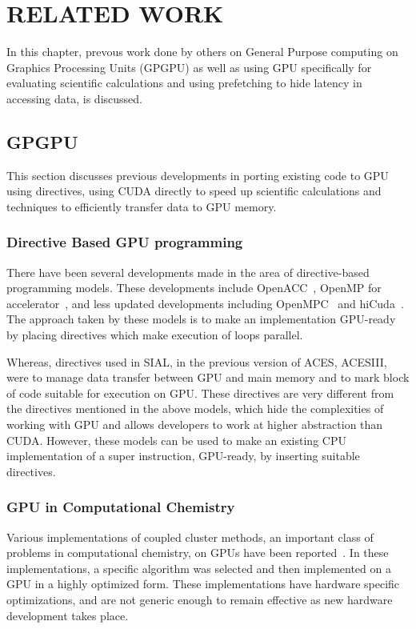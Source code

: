 \chapter{RELATED WORK}\label{lit}
In this chapter, prevous work done by others on General Purpose computing on Graphics Processing
Units (GPGPU) as well as using GPU specifically for evaluating scientific calculations
and using prefetching to hide latency in accessing data, is discussed.

\section{GPGPU}
This section discusses previous developments in porting existing
code to GPU using directives, using CUDA directly to speed up scientific calculations and
techniques to efficiently transfer data to GPU memory.

\subsection{Directive Based GPU programming}
There have been several developments made in the area of directive-based programming models. These
developments include OpenACC~\cite{openacc}, OpenMP for
accelerator~\cite{openmpforaccelerators}, and less updated developments including
OpenMPC~\cite{openmpc} and hiCuda~\cite{hicuda}. The approach taken by these models
is to make an implementation GPU-ready by placing directives which make
execution of loops parallel.

Whereas, directives used in SIAL, in the previous version of ACES, ACESIII, were to manage
data transfer between GPU and main memory and to mark block of code suitable for
execution on GPU. These directives are very different from the directives mentioned
in the above models, which hide the complexities of working with GPU and allows
developers to work at higher abstraction than CUDA.
However, these models can be used to make an existing CPU implementation
of a super instruction, GPU-ready, by inserting suitable directives.

\subsection{GPU in Computational Chemistry}
Various implementations of coupled cluster methods, an important class of problems
in computational chemistry,
on GPUs have been reported~\cite{bhaskar2013, deprince2011, maw2011}. In these
implementations, a specific algorithm was selected and then implemented on a
GPU in a highly optimized form. These implementations have hardware specific
optimizations, and are not generic enough to remain effective as new hardware
development takes place.

